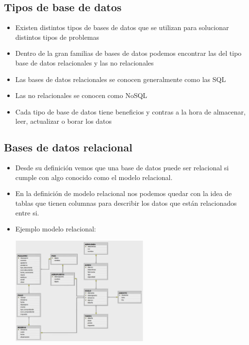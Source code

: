 \documentclass[%
 reprint,
 amsmath,amssymb,
 aps,
]{revtex4-1}
\begin{document}
\subsection{Tipos de base de datos}
	          \begin{itemize}
		\item Existen distintos tipos de bases de datos que se utilizan para solucionar distintos tipos de problemas
                     \item Dentro de la gran familias de bases de datos podemos encontrar las del tipo base de datos relacionales y las no relacionales
		\item Las bases de datos relacionales se conocen generalmente como las SQL
		\item Las no relacionales se conocen como NoSQL
		\item Cada tipo de base de datos tiene beneficios y contras a la hora de almacenar, leer, actualizar o borar los datos
	           \end{itemize}
\subsection{Bases de datos relacional}
	          \begin{itemize}
		\item Desde su definición vemos que una base de datos puede ser relacional si cumple con algo conocido como el modelo relacional.
                     \item En la definición de modelo relacional nos podemos quedar con la idea de tablas que tienen columnas para describir los datos que están relacionados entre si.
		\item Ejemplo modelo relacional:
                     \begin{center}
		\includegraphics[width=7cm]{./Imagenes/1}
		\end{center}	
	          \end{itemize}
\end{document}
